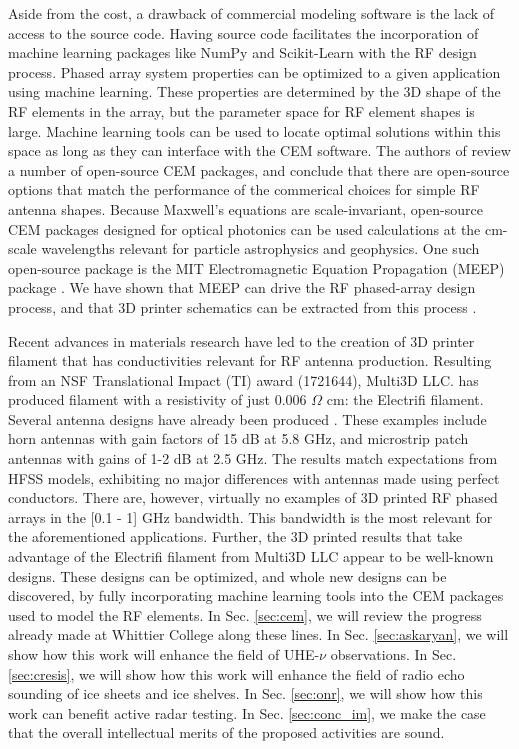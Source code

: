 \documentclass[../../main.tex]{subfiles}
\begin{document}
Aside from the cost, a drawback of commercial modeling software is the lack of access to the source code.  Having source code facilitates the incorporation of machine learning packages like NumPy and Scikit-Learn with the RF design process.  Phased array system properties can be optimized to a given application using machine learning.  These properties are determined by the 3D shape of the RF elements in the array, but the parameter space for RF element shapes is large.  Machine learning tools can be used to locate optimal solutions within this space as long as they can interface with the CEM software.  The authors of \cite{10.3390/electronics8121506} review a number of open-source CEM packages, and conclude that there are open-source options that match the performance of the commerical choices for simple RF antenna shapes.  Because Maxwell's equations are scale-invariant, open-source CEM packages designed for optical photonics can be used calculations at the cm-scale wavelengths relevant for particle astrophysics and geophysics.  One such open-source package is the MIT Electromagnetic Equation Propagation (MEEP) package \cite{10.1016/j.cpc.2009.11.008}.  We have shown that MEEP can drive the RF phased-array design process, and that 3D printer schematics can be extracted from this process \cite{electronics10040415,meepcon2022,10.1016/j.cpc.2009.11.008}. \\ \vspace{2.5mm}

Recent advances in materials research have led to the creation of 3D printer filament that has conductivities relevant for RF antenna production.  Resulting from an NSF Translational Impact (TI) award (1721644), Multi3D LLC. has produced filament with a resistivity of just 0.006 $\Omega$ cm: the Electrifi filament.  Several antenna designs have already been produced \cite{8786183,10.1049/iet-map.2017.0104}.  These examples include horn antennas with gain factors of 15 dB at 5.8 GHz, and microstrip patch antennas with gains of 1-2 dB at 2.5 GHz.  The results match expectations from HFSS models, exhibiting no major differences with antennas made using perfect conductors.  There are, however, virtually no examples of 3D printed RF phased arrays in the [0.1 - 1] GHz bandwidth.  This bandwidth is the most relevant for the aforementioned applications.  Further, the 3D printed results that take advantage of the Electrifi filament from Multi3D LLC appear to be well-known designs.  These designs can be optimized, and whole new designs can be discovered, by fully incorporating machine learning tools into the CEM packages used to model the RF elements.  In Sec. \ref{sec:cem}, we will review the progress already made at Whittier College along these lines.  In Sec. \ref{sec:askaryan}, we will show how this work will enhance the field of UHE-$\nu$ observations.  In Sec. \ref{sec:cresis}, we will show how this work will enhance the field of radio echo sounding of ice sheets and ice shelves.  In Sec. \ref{sec:onr}, we will show how this work can benefit active radar testing.  In Sec. \ref{sec:conc_im}, we make the case that the overall intellectual merits of the proposed activities are sound.
\end{document}
